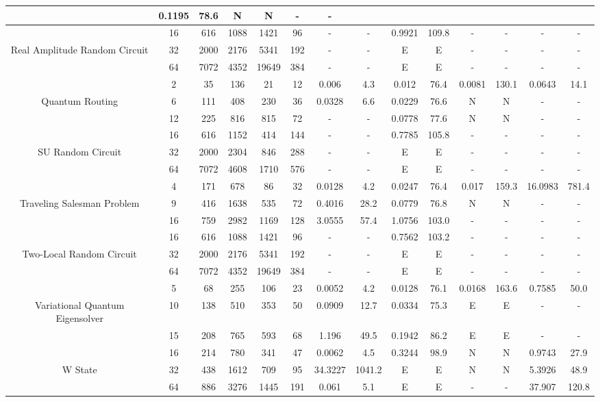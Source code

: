 \begin{table}[htb]
{\begin{tabular}{|c|c|c|c|c|c|c|c|c|c|c|c|c|c|}
 & 0.1195 & 78.6
 & N & N 
 & - & -
 \\
\hline
 & 
16 & 616 & 1088 & 1421 & 96
 & - & -
 & 0.9921 & 109.8
 & - & -
 & - & -
 \\
Real Amplitude Random Circuit & 
32 & 2000 & 2176 & 5341 & 192
 & - & -
 & E & E
 & - & -
 & - & -
 \\
 & 
64 & 7072 & 4352 & 19649 & 384
 & - & -
 & E & E
 & - & -
 & - & -
 \\
\hline
 & 
2 & 35 & 136 & 21 & 12
 & 0.006 & 4.3
 & 0.012 & 76.4
 & 0.0081 & 130.1
 & 0.0643 & 14.1
 \\
Quantum Routing & 
6 & 111 & 408 & 230 & 36
 & 0.0328 & 6.6
 & 0.0229 & 76.6
 & N & N 
 & - & -
 \\
 & 
12 & 225 & 816 & 815 & 72
 & - & -
 & 0.0778 & 77.6
 & N & N 
 & - & -
 \\
\hline
 & 
16 & 616 & 1152 & 414 & 144
 & - & -
 & 0.7785 & 105.8
 & - & -
 & - & -
 \\
SU Random Circuit & 
32 & 2000 & 2304 & 846 & 288
 & - & -
 & E & E
 & - & -
 & - & -
 \\
 & 
64 & 7072 & 4608 & 1710 & 576
 & - & -
 & E & E
 & - & -
 & - & -
 \\
\hline
 & 
4 & 171 & 678 & 86 & 32
 & 0.0128 & 4.2
 & 0.0247 & 76.4
 & 0.017 & 159.3
 & 16.0983 & 781.4
 \\
Traveling Salesman Problem & 
9 & 416 & 1638 & 535 & 72
 & 0.4016 & 28.2
 & 0.0779 & 76.8
 & N & N 
 & - & -
 \\
 & 
16 & 759 & 2982 & 1169 & 128
 & 3.0555 & 57.4
 & 1.0756 & 103.0
 & - & -
 & - & -
 \\
\hline
 & 
16 & 616 & 1088 & 1421 & 96
 & - & -
 & 0.7562 & 103.2
 & - & -
 & - & -
 \\
Two-Local Random Circuit & 
32 & 2000 & 2176 & 5341 & 192
 & - & -
 & E & E
 & - & -
 & - & -
 \\
 & 
64 & 7072 & 4352 & 19649 & 384
 & - & -
 & E & E
 & - & -
 & - & -
 \\
\hline
 & 
5 & 68 & 255 & 106 & 23
 & 0.0052 & 4.2
 & 0.0128 & 76.1
 & 0.0168 & 163.6
 & 0.7585 & 50.0
 \\
Variational Quantum Eigensolver & 
10 & 138 & 510 & 353 & 50
 & 0.0909 & 12.7
 & 0.0334 & 75.3
 & E & E
 & - & -
 \\
 & 
15 & 208 & 765 & 593 & 68
 & 1.196 & 49.5
 & 0.1942 & 86.2
 & E & E
 & - & -
 \\
\hline
 & 
16 & 214 & 780 & 341 & 47
 & 0.0062 & 4.5
 & 0.3244 & 98.9
 & N & N 
 & 0.9743 & 27.9
 \\
W State & 
32 & 438 & 1612 & 709 & 95
 & 34.3227 & 1041.2
 & E & E
 & N & N 
 & 5.3926 & 48.9
 \\
 & 
64 & 886 & 3276 & 1445 & 191
 & 0.061 & 5.1
 & E & E
 & - & -
 & 37.907 & 120.8
 \\
\hline
\end{tabular}}
\end{table}